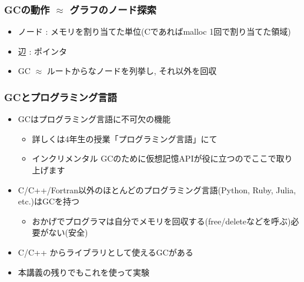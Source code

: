 \documentclass[12pt,dvipdfmx]{beamer}
\begin{document}
\begin{frame}
\frametitle{GCの動作 $\approx$ グラフのノード探索}
\begin{itemize}
\item ノード : メモリを割り当てた単位(Cであればmalloc 1回で割り当てた領域)
\item 辺 : ポインタ
\item GC $\approx$ ルートからなノードを列挙し, それ以外を回収
\end{itemize}

\begin{center}
%
%
%
%
%
\end{center}
\end{frame}

\begin{frame}
\frametitle{GCとプログラミング言語}
\begin{itemize}
\item GCはプログラミング言語に不可欠の機能
    \begin{itemize}
    \item 詳しくは4年生の授業「プログラミング言語」にて
    \item インクリメンタル GCのために仮想記憶APIが役に立つのでここで取り上げます
    \end{itemize}
  
\item C/C++/Fortran以外のほとんどのプログラミング言語(Python, Ruby, Julia, etc.)はGCを持つ
  \begin{itemize}
  \item おかげでプログラマは自分でメモリを回収する(free/deleteなどを呼ぶ)必要がない(安全)
  \end{itemize}

\item C/C++ からライブラリとして使えるGCがある
\item 本講義の残りでもこれを使って実験
\end{itemize}
\end{frame}
\end{document}
